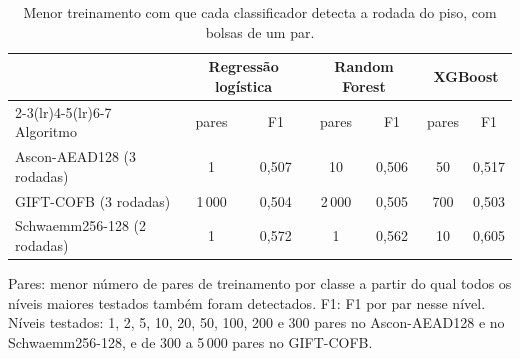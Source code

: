 \begin{table}[htb]
\centering
\caption{Menor treinamento com que cada classificador detecta a rodada do piso, com bolsas de um par.}
\label{tab:res-dados-minimos}
\footnotesize
\setlength{\tabcolsep}{4pt}
\begin{tabular}{lcccccc}
\toprule
 & \multicolumn{2}{c}{Regressão logística} & \multicolumn{2}{c}{Random Forest} & \multicolumn{2}{c}{XGBoost} \\
\cmidrule(lr){2-3}\cmidrule(lr){4-5}\cmidrule(lr){6-7}
Algoritmo & pares & F1 & pares & F1 & pares & F1 \\
\midrule
Ascon-AEAD128 (3 rodadas)   & 1     & 0,507 & 10    & 0,506 & 50  & 0,517 \\
GIFT-COFB (3 rodadas)       & 1\,000 & 0,504 & 2\,000 & 0,505 & 700 & 0,503 \\
Schwaemm256-128 (2 rodadas) & 1     & 0,572 & 1     & 0,562 & 10  & 0,605 \\
\bottomrule
\end{tabular}
\par\smallskip\footnotesize Pares: menor número de pares de treinamento por classe a partir do qual todos os níveis maiores testados também foram detectados. F1: F1 por par nesse nível. Níveis testados: 1, 2, 5, 10, 20, 50, 100, 200 e 300 pares no Ascon-AEAD128 e no Schwaemm256-128, e de 300 a 5\,000 pares no GIFT-COFB.
\end{table}


